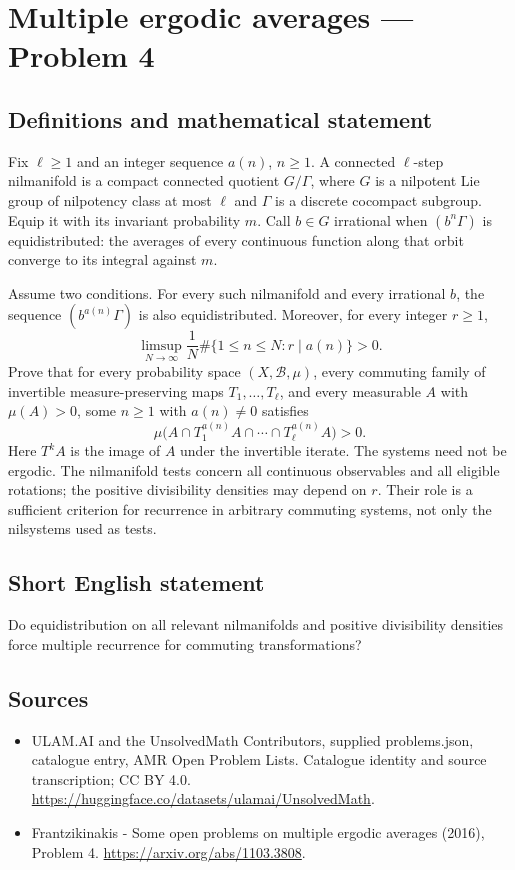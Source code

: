 \documentclass[11pt,a4paper]{article}
\begin{document}
\section*{Multiple ergodic averages — Problem 4}\label{statement}

\subsection{Definitions and mathematical statement}
Fix $\ell\ge1$ and an integer sequence $a(n)$, $n\ge1$.
A connected $\ell$-step nilmanifold is a compact connected
quotient $G/\Gamma$, where $G$ is a nilpotent Lie group of
nilpotency class at most $\ell$ and $\Gamma$ is a discrete
cocompact subgroup. Equip it with its invariant probability $m$.
Call $b\in G$ irrational when $(b^n\Gamma)$ is equidistributed:
the averages of every continuous function along that orbit
converge to its integral against $m$.

Assume two conditions. For every such nilmanifold and every
irrational $b$, the sequence $(b^{a(n)}\Gamma)$ is also
equidistributed. Moreover, for every integer $r\ge1$,
\[
 \limsup_{N\to\infty}\frac1N
          \#\{1\le n\le N:r\mid a(n)\}>0.
\]
Prove that for every probability space $(X,\mathcal B,\mu)$,
every commuting family of invertible measure-preserving maps
$T_1,\ldots,T_\ell$, and every measurable $A$ with $\mu(A)>0$,
some $n\ge1$ with $a(n)\ne0$ satisfies
\[
          \mu\bigl(A\cap T_1^{a(n)}A\cap\cdots
                         \cap T_\ell^{a(n)}A\bigr)>0.
\]
Here $T^kA$ is the image of $A$ under the invertible iterate.
The systems need not be ergodic. The nilmanifold tests concern
all continuous observables and all eligible rotations; the
positive divisibility densities may depend on $r$. Their role
is a sufficient criterion for recurrence in arbitrary commuting
systems, not only the nilsystems used as tests.
\subsection{Short English statement}
Do equidistribution on all relevant nilmanifolds and positive divisibility densities force multiple recurrence for commuting transformations?
\subsection{Sources}
\begin{itemize}
\item[S1] ULAM.AI and the UnsolvedMath Contributors, supplied problems.json, catalogue entry, AMR Open Problem Lists. Catalogue identity and source transcription; CC BY 4.0.
\url{https://huggingface.co/datasets/ulamai/UnsolvedMath}.
\item[S2] Frantzikinakis - Some open problems on multiple ergodic averages (2016), Problem 4. 
\url{https://arxiv.org/abs/1103.3808}.
\end{itemize}
\end{document}

